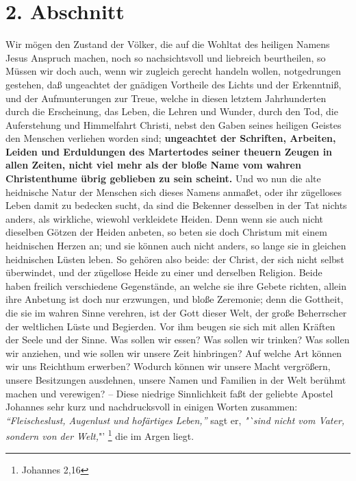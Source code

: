 \section{2. Abschnitt} \label{kap1_ab2}
Wir mögen den Zustand der Völker, die auf die Wohltat des heiligen Namens Jesus
Anspruch machen, noch so nachsichtsvoll und liebreich beurtheilen, so Müssen wir
doch auch, wenn wir zugleich gerecht handeln wollen, notgedrungen gestehen, daß
ungeachtet der gnädigen Vortheile des Lichts und der Erkenntniß, und der
Aufmunterungen zur Treue, welche in diesen letztem Jahrhunderten durch die
Erscheinung, das Leben, die Lehren und Wunder, durch den Tod, die Auferstehung
und Himmelfahrt Christi, nebst den Gaben seines heiligen Geistes den Menschen
verliehen worden sind; \textbf{ungeachtet der Schriften, Arbeiten, Leiden und
Erduldungen des Martertodes seiner theuern Zeugen in allen Zeiten, nicht viel
mehr als der bloße Name vom wahren Christenthume übrig geblieben zu sein
scheint.} Und wo nun die alte heidnische Natur der Menschen sich dieses Namens
anmaßet, oder ihr zügelloses Leben damit zu bedecken sucht, da sind die Bekenner
desselben in der Tat nichts anders, als wirkliche, wiewohl verkleidete Heiden.
Denn wenn sie auch nicht dieselben Götzen der Heiden anbeten, so beten sie doch
Christum mit einem heidnischen Herzen an; und sie können auch nicht anders, so
lange sie in gleichen heidnischen Lüsten leben. So gehören also beide: der
Christ, der sich nicht selbst überwindet, und der zügellose Heide zu einer und
derselben Religion. Beide haben freilich verschiedene Gegenstände,
an welche sie ihre Gebete richten, allein ihre Anbetung ist doch nur erzwungen,
und bloße Zeremonie; denn die Gottheit, die sie im wahren Sinne verehren, ist
der Gott dieser Welt, der große Beherrscher der weltlichen Lüste und Begierden.
Vor ihm beugen sie sich mit allen Kräften der Seele und der Sinne. Was sollen
wir essen? Was sollen wir trinken? Was sollen wir anziehen, und wie sollen wir
unsere Zeit hinbringen? Auf welche Art können wir uns Reichthum erwerben?
Wodurch können wir unsere Macht vergrößern, unsere Besitzungen ausdehnen, unsere
Namen und Familien in der Welt berühmt machen und verewigen? -- Diese niedrige
Sinnlichkeit faßt der geliebte Apostel Johannes sehr kurz und nachdrucksvoll in
einigen Worten zusammen:
\textit{"`Fleischeslust, Augenlust und hofärtiges
Leben,"'} sagt er, \textit{"`sind nicht vom Vater, sondern von der Welt,}"'
\footnote{Johannes 2,16}
die im Argen liegt.

